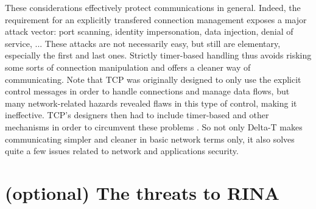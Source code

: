 \documentclass[a4paper]{proc}
\begin{document}
These considerations effectively protect communications in general. Indeed, the
requirement for an explicitly transfered connection management exposes a major
attack vector: port scanning, identity impersonation, data injection, denial of
service, ... These attacks are not necessarily easy, but still are elementary,
especially the first and last ones. Strictly timer-based handling thus avoids
risking some sorts of connection manipulation and offers a cleaner way of
communicating. Note that TCP was originally designed to only use the explicit
control messages in order to handle connections and manage data flows, but many
network-related hazards revealed flaws in this type of control, making it
ineffective. TCP's designers then had to include timer-based and other
mechanisms in order to circumvent these problems \cite{delta-t}. So not only
Delta-T makes communicating simpler and cleaner in basic network terms only, it
also solves quite a few issues related to network and applications security.


\part{(optional) The threats to RINA}


\nocite{*}
\newpage


\end{document}
